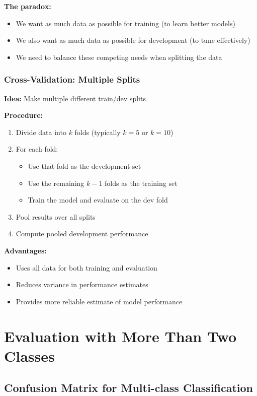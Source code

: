 \documentclass[11pt,a4paper]{article}
\theoremstyle{definition}
\theoremstyle{plain}
\theoremstyle{remark}
\begin{document}
\textbf{The paradox:}
\begin{itemize}
    \item We want as much data as possible for training (to learn better models)
    \item We also want as much data as possible for development (to tune effectively)
    \item We need to balance these competing needs when splitting the data
\end{itemize}

\subsubsection{Cross-Validation: Multiple Splits}

\textbf{Idea:} Make multiple different train/dev splits

\textbf{Procedure:}
\begin{enumerate}
    \item Divide data into $k$ folds (typically $k = 5$ or $k = 10$)
    \item For each fold:
    \begin{itemize}
        \item Use that fold as the development set
        \item Use the remaining $k-1$ folds as the training set
        \item Train the model and evaluate on the dev fold
    \end{itemize}
    \item Pool results over all splits
    \item Compute pooled development performance
\end{enumerate}

\textbf{Advantages:}
\begin{itemize}
    \item Uses all data for both training and evaluation
    \item Reduces variance in performance estimates
    \item Provides more reliable estimate of model performance
\end{itemize}

\section{Evaluation with More Than Two Classes}

\subsection{Confusion Matrix for Multi-class Classification}
\end{document}

